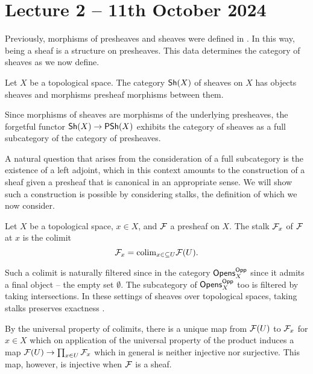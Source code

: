 \section{Lecture 2 -- 11th October 2024}\label{sec: lecture 2}
Previously, morphisms of presheaves and sheaves were defined in . In this way, being a sheaf is a structure on presheaves. This data determines the category of sheaves as we now define. 
\begin{definition}\label{def: category of sheaves}
    Let $X$ be a topological space. The category $\mathsf{Sh}(X)$ of sheaves on $X$ has objects sheaves and morphisms presheaf morphisms between them. 
\end{definition}
\begin{remark}\label{rmk: forgetful functor is fully faithful}
    Since morphisms of sheaves are morphisms of the underlying presheaves, the forgetful functor $\mathsf{Sh}(X)\to\mathsf{PSh}(X)$ exhibits the category of sheaves as a full subcategory of the category of presheaves. 
\end{remark}
A natural question that arises from the consideration of a full subcategory is the existence of a left adjoint, which in this context amounts to the construction of a sheaf given a presheaf that is canonical in an appropriate sense. We will show such a construction is possible by considering stalks, the definition of which we now consider. 
\begin{definition}[Stalk]\label{def: stalk}
    Let $X$ be a topological space, $x\in X$, and $\mathcal{F}$ a presheaf on $X$. The stalk $\mathcal{F}_{x}$ of $\mathcal{F}$ at $x$ is the colimit 
    $$\mathcal{F}_{x}=\mathrm{colim}_{x\in\subseteq U}\mathcal{F}(U).$$
\end{definition}
\begin{remark}
    Such a colimit is naturally filtered since in the category $\mathsf{Opens}_{X}^{\mathsf{Opp}}$ since it admits a final object -- the empty set $\emptyset$. The subcategory of $\mathsf{Opens}_{X}^{\mathsf{Opp}}$ too is filtered by taking intersections. In these settings of sheaves over topological spaces,  taking stalks preserves exactness \cite[\href{https://stacks.math.columbia.edu/tag/04B0}{Tag 04B0}]{stacks-project}.  
\end{remark}
By the universal property of colimits, there is a unique map from $\mathcal{F}(U)$ to $\mathcal{F}_{x}$ for $x\in X$ which on application of the universal property of the product induces a map $\mathcal{F}(U)\to\prod_{x\in U}\mathcal{F}_{x}$ which in general is neither injective nor surjective. This map, however, is injective when $\mathcal{F}$ is a sheaf. 

